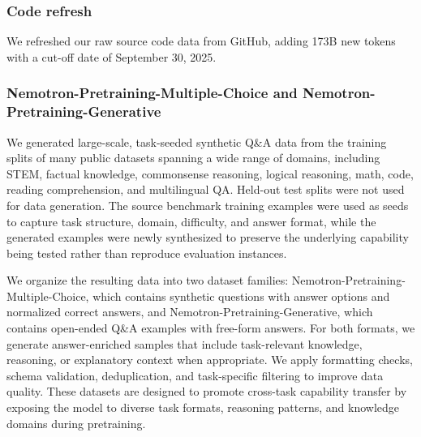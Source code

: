 

\subsubsection{Code refresh}

We refreshed our raw source code data from GitHub, adding 173B new tokens with a cut-off date of September 30, 2025.

\subsubsection{Nemotron-Pretraining-Multiple-Choice and Nemotron-Pretraining-Generative}


We generated large-scale, task-seeded synthetic Q\&A data from the training splits of many public datasets spanning a wide range of domains, including STEM, factual knowledge, commonsense reasoning, logical reasoning, math, code, reading comprehension, and multilingual QA.
Held-out test splits were not used for data generation. The source benchmark training examples were used as seeds to capture task structure, domain, difficulty, and answer format, while the generated examples were newly synthesized to preserve the underlying capability being tested rather than reproduce evaluation instances.

We organize the resulting data into two dataset families: Nemotron-Pretraining-Multiple-Choice, which contains synthetic questions with answer options and normalized correct answers, and Nemotron-Pretraining-Generative, which contains open-ended Q\&A examples with free-form answers. For both formats, we generate answer-enriched samples that include task-relevant knowledge, reasoning, or explanatory context when appropriate. We apply formatting checks, schema validation, deduplication, and task-specific filtering to improve data quality. These datasets are designed to promote cross-task capability transfer by exposing the model to diverse task formats, reasoning patterns, and knowledge domains during pretraining.

